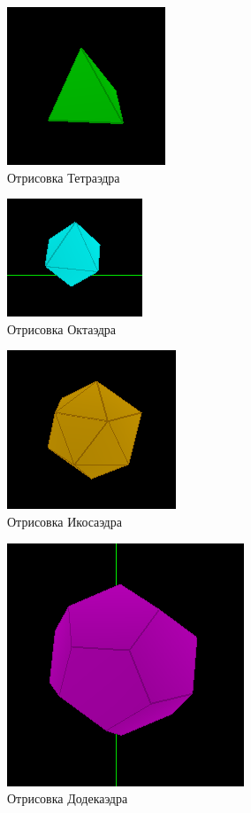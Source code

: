 \documentclass[12pt, a4paper]{article}
\begin{document}
\begin{figure}[h]
	\centering
	\includegraphics[scale=1.75]{pyramid}
	\caption{Отрисовка Тетраэдра}
	\label{fig:mesh1}
\end{figure}

\begin{figure}[h]
	\centering
	\includegraphics[scale=2]{oct}
	\caption{Отрисовка Октаэдра}
	\label{fig:mesh1}
\end{figure}

\begin{figure}[h]
	\centering
	\includegraphics[scale=1.5]{ico}
	\caption{Отрисовка Икосаэдра}
	\label{fig:mesh1}
\end{figure}

\begin{figure}[h]
	\centering
	\includegraphics[scale=1.1]{dod}
	\caption{Отрисовка Додекаэдра}
	\label{fig:mesh1}
\end{figure}
\end{document}
